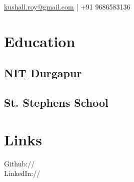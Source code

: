 \documentclass[]{kushal-resume}
\begin{document}
%
%

%
%

 {  
\href{mailto:kushall.roy@gmail.com}{kushall.roy@gmail.com} | +91 9686583136} \\

%
%

\begin{minipage}[t]{0.33\textwidth} 


\section{Education}

\subsection{NIT  Durgapur}
\sectionsep

\subsection{St. Stephens School}
\sectionsep


\section{Links}
Github:// \href{https://github.com/kushal-r}{} \\
LinkedIn://  \href{https://www.linkedin.com/in/roykushal/}{} \\
\sectionsep


\vspace{\topsep}

\end{minipage}
\end{document}
